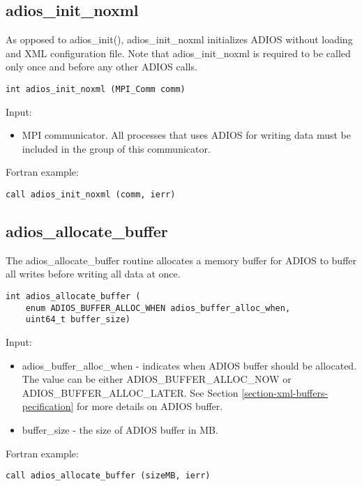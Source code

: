 \subsection{adios\_init\_noxml}

As opposed to adios\_init(), adios\_init\_noxml initializes ADIOS without loading
and XML configuration file. Note that adios\_init\_noxml is required to be called only 
once and before any other ADIOS calls. 

\begin{lstlisting}[alsolanguage=C,caption={},label={}]
int adios_init_noxml (MPI_Comm comm)
\end{lstlisting}

Input: 
\begin{itemize}
\item MPI communicator. All processes that uses ADIOS for writing data must be included in the group of this communicator.
\end{itemize}

Fortran example: 
\begin{lstlisting}[alsolanguage=Fortran,caption={},label={}]
call adios_init_noxml (comm, ierr)
\end{lstlisting}


\subsection{adios\_allocate\_buffer}

The adios\_allocate\_buffer routine allocates a memory buffer for ADIOS to buffer all writes before writing all data at once. 

\begin{lstlisting}[alsolanguage=C,caption={},label={}]
int adios_allocate_buffer (
    enum ADIOS_BUFFER_ALLOC_WHEN adios_buffer_alloc_when,
    uint64_t buffer_size)
\end{lstlisting}

Input: 
\begin{itemize}
\item adios\_buffer\_alloc\_when - indicates when ADIOS buffer should be allocated. 
The value can be either {\small ADIOS\_BUFFER\_ALLOC\_NOW} or 
{\small ADIOS\_BUFFER\_ALLOC\_LATER}. See Section \ref{section-xml-buffers-pecification} 
for more details on ADIOS buffer.
\item buffer\_size - the size of ADIOS buffer in MB. 
\end{itemize}


Fortran example: 
\begin{lstlisting}[alsolanguage=Fortran,caption={},label={}]
call adios_allocate_buffer (sizeMB, ierr)
\end{lstlisting}

